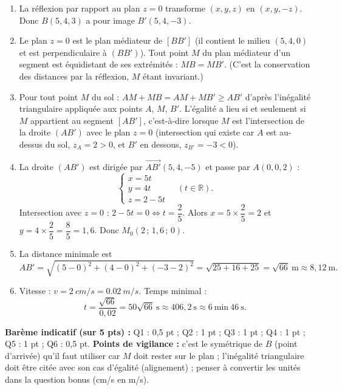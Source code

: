 \documentclass[11pt]{article}
\begin{document}
\begin{corrige}
\begin{enumerate}
\item La réflexion par rapport au plan $z=0$ transforme $(x,y,z)$ en $(x,y,-z)$. Donc $B(5,4,3)$ a pour image $B'(5,4,-3)$.
\item Le plan $z=0$ est le plan médiateur de $[BB']$ (il contient le milieu $(5,4,0)$ et est perpendiculaire à $(BB')$). Tout point $M$ du plan médiateur d'un segment est équidistant de ses extrémités : $MB=MB'$. (C'est la conservation des distances par la réflexion, $M$ étant invariant.)
\item Pour tout point $M$ du sol : $AM+MB=AM+MB'\geq AB'$ d'après l'inégalité triangulaire appliquée aux points $A$, $M$, $B'$. L'égalité a lieu si et seulement si $M$ appartient au segment $[AB']$, c'est-à-dire lorsque $M$ est l'intersection de la droite $(AB')$ avec le plan $z=0$ (intersection qui existe car $A$ est au-dessus du sol, $z_A=2>0$, et $B'$ en dessous, $z_{B'}=-3<0$).
\item La droite $(AB')$ est dirigée par $\overrightarrow{AB'}(5,4,-5)$ et passe par $A(0,0,2)$ :
\[ \begin{cases} x=5t \\ y=4t \\ z=2-5t \end{cases}\quad(t\in\mathbb{R}). \]
Intersection avec $z=0$ : $2-5t=0\iff t=\dfrac{2}{5}$. Alors $x=5\times\dfrac{2}{5}=2$ et $y=4\times\dfrac{2}{5}=\dfrac{8}{5}=1,6$. Donc $M_0(2\,;\,1,6\,;\,0)$.
\item La distance minimale est
\[ AB'=\sqrt{(5-0)^2+(4-0)^2+(-3-2)^2}=\sqrt{25+16+25}=\sqrt{66}\ \text{m}\approx 8,12\ \text{m}. \]
\item Vitesse : $v=\SI{2}{cm/s}=\SI{0,02}{m/s}$. Temps minimal :
\[ t=\dfrac{\sqrt{66}}{0,02}=50\sqrt{66}\ \text{s}\approx 406,2\ \text{s}\approx 6\ \text{min}\ 46\ \text{s}. \]
\end{enumerate}
\textbf{Barème indicatif (sur 5 pts) :} Q1 : 0,5 pt ; Q2 : 1 pt ; Q3 : 1 pt ; Q4 : 1 pt ; Q5 : 1 pt ; Q6 : 0,5 pt.
\textbf{Points de vigilance :} c'est le symétrique de $B$ (point d'arrivée) qu'il faut utiliser car $M$ doit rester sur le plan ; l'inégalité triangulaire doit être citée avec son cas d'égalité (alignement) ; penser à convertir les unités dans la question bonus (cm/s en m/s).
\end{corrige}
\end{document}
